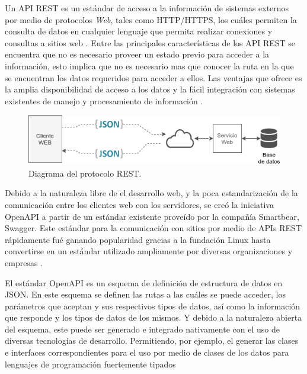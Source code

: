 Un API REST es un estándar de acceso a la información de sistemas externos por medio de protocolos \textit{Web}, tales como HTTP/HTTPS, los cuáles permiten la consulta de datos en cualquier lenguaje que permita realizar conexiones y consultas a sitios web \cite{REST_API_design}. Entre las principales características de los API REST se encuentra que no es necesario proveer un estado previo para acceder a la información, esto implica que no es necesario mas que conocer la ruta en la que se encuentran los datos requeridos para acceder a ellos. Las ventajas que ofrece es la amplia disponibilidad de acceso a los datos y la fácil integración con sistemas existentes de manejo y procesamiento de información \cite{OpenAPI_example}.

\begin{figure}[!ht]
	\centering
	\includegraphics[width=.70\linewidth]{images/diagrams/REST.png}
	\caption{Diagrama del protocolo REST.}
	\label{fig:coms_nodos_raspberry}
\end{figure}


Debido a la naturaleza libre de el desarrollo web, y la poca estandarización de la comunicación entre los clientes web con los servidores, se creó la iniciativa OpenAPI a partir de un estándar existente proveído por la compañía Smartbear, Swagger. Este estándar para la comunicación con sitios por medio de APIs REST rápidamente fué ganando popularidad gracias a la fundación Linux hasta convertirse en un estándar utilizado ampliamente por diversas organizaciones y empresas \cite{OpenAPI_foundation}.

El estándar OpenAPI es un esquema de definición de estructura de datos en JSON. En este esquema se definen las rutas a las cuáles se puede acceder, los parámetros que aceptan y sus respectivos tipos de datos, así como la información que responde y los tipos de datos de los mismos. Y debido a la naturaleza abierta del esquema, este puede ser generado e integrado nativamente con el uso de diversas tecnologías de desarrollo. Permitiendo, por ejemplo, el generar las clases e interfaces correspondientes para el uso por medio de clases de los datos para lenguajes de programación fuertemente tipados \cite{openapi_generator}

